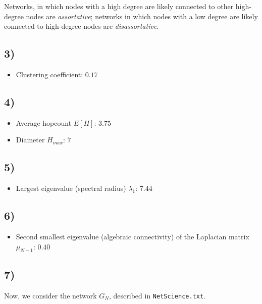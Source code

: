 \documentclass{article}
\begin{document}
\vspace*{0.5em}
\noindent Networks, in which nodes with a high degree are likely
connected to other high-degree nodes are \emph{assortative}; networks
in which nodes with a low degree are likely connected to high-degree
nodes are \emph{disassortative}.

\subsection*{3)}

\begin{itemize}
  \item Clustering coefficient: $0.17$
\end{itemize}

\subsection*{4)}

\begin{itemize}
  \item Average hopcount $E[H]$: $3.75$
  \item Diameter $H_{max}$: $7$
\end{itemize}

\subsection*{5)}
\begin{itemize}
  \item Largest eigenvalue (spectral radius) $\lambda_1$: $7.44$
\end{itemize}
\subsection*{6)}

\begin{itemize}
\item Second smallest eigenvalue (algebraic connectivity) of the
  Laplacian matrix $\mu_{N-1}$: $0.40$
\end{itemize}

\subsection*{7)}
Now, we consider the network $G_N$, described in \texttt{NetScience.txt}.
\end{document}
